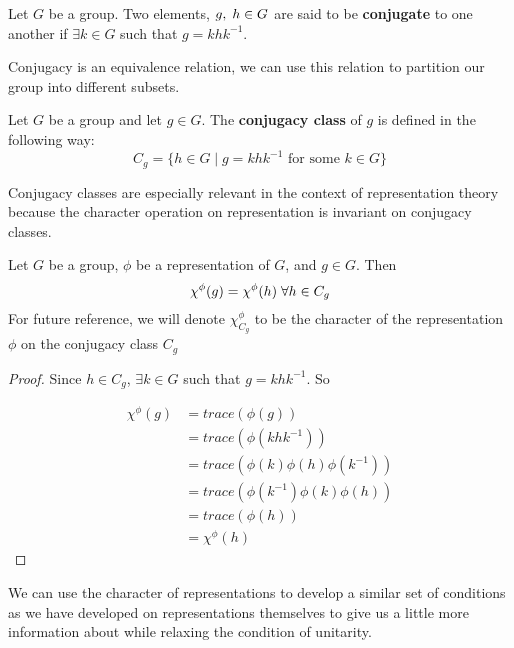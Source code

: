 \begin{definition}
	Let $G$ be a group. Two elements, $g,\hspace{1mm}h \in G$ are said to be \textbf{conjugate} to one another if $\exists k \in G$ such that $g = khk^{-1}$.
\end{definition}

Conjugacy is an equivalence relation, we can use this relation to partition our group into different subsets.

\begin{definition}
	Let $G$ be a group and let $g \in G$. The \textbf{conjugacy class} of $g$ is defined in the following way:
$$C_g = \{h\in G \mid g = khk^{-1} \text{ for some } k \in G \}$$
\end{definition}

Conjugacy classes are especially relevant in the context of representation theory because the character operation on representation is invariant on conjugacy classes.

\begin{theorem}
	Let $G$ be a group, $\phi$ be a representation of $G$, and $g\in G$. Then 
$$\chi^\phi(g) = \chi^\phi(h) \hspace{1mm}\forall h \in C_g$$
For future reference, we will denote $\chi^\phi_{C_g}$ to be the character of the representation $\phi$ on the conjugacy class $C_g$
\end{theorem}
\begin{proof}\cite{Mendes}  Since $h\in C_g$, $\exists k\in G$ such that $g = khk^{-1}$. So 

\begin{equation}
	\begin{aligned}
		\chi^\phi(g) &= trace(\phi(g)) \\
					&= trace(\phi(khk^{-1}))\\ 
					&= trace(\phi(k)\phi(h)\phi(k^{-1})) \\
					&= trace(\phi(k^{-1})\phi(k)\phi(h)) \\
					&= trace(\phi(h)) \\
					&= \chi^\phi(h) 
	\end{aligned}
\end{equation}
\end{proof}

We can use the character of representations to develop a similar set of conditions as we have developed on representations themselves to give us a little more information about while relaxing the condition of unitarity.

